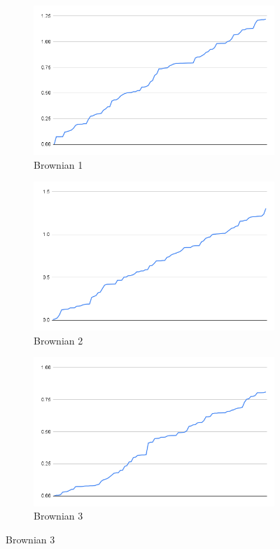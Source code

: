 \documentclass{article}
\begin{document}
\subsection{}
\begin{figure}[ht!]
\begin{subfigure}[h]{0.3\linewidth}
  \includegraphics[width=\linewidth]{img/qv1.png}
  \caption{Brownian 1}
\end{subfigure}
\hfill
\begin{subfigure}[h]{0.3\linewidth}
  \includegraphics[width=\linewidth]{img/qv2.png}
  \caption{Brownian 2}
\end{subfigure}
\hfill
\begin{subfigure}[h]{0.3\linewidth}
  \includegraphics[width=\linewidth]{img/qv3.png}
  \caption{Brownian 3}
\end{subfigure}
\hfill
\end{figure}
\end{document}

